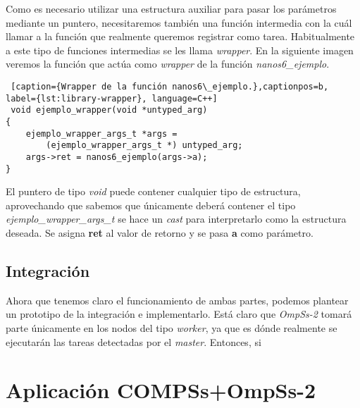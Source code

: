 Como es necesario utilizar una estructura auxiliar para pasar los parámetros mediante un puntero, necesitaremos también una función intermedia con la cuál llamar a la función que realmente queremos registrar como tarea. Habitualmente a este tipo de funciones intermedias se les llama \textit{wrapper}. En la siguiente imagen veremos la función que actúa como \textit{wrapper} de la función \textit{nanos6\_ejemplo}. \smallskip

\begin{lstlisting} [caption={Wrapper de la función nanos6\_ejemplo.},captionpos=b, label={lst:library-wrapper}, language=C++]
 void ejemplo_wrapper(void *untyped_arg)
{
    ejemplo_wrapper_args_t *args = 
        (ejemplo_wrapper_args_t *) untyped_arg;
    args->ret = nanos6_ejemplo(args->a);
}
\end{lstlisting}

El puntero de tipo \textit{void} puede contener cualquier tipo de estructura, aprovechando que sabemos que únicamente deberá contener el tipo \textit{ejemplo\_wrapper\_args\_t} se hace un \textit{cast} para interpretarlo como la estructura deseada. Se asigna \textbf{ret} al valor de retorno y se pasa \textbf{a} como parámetro.


\subsection{Integración}


Ahora que tenemos claro el funcionamiento de ambas partes, podemos plantear un prototipo de la integración e implementarlo. Está claro que \textit{OmpSs-2} tomará parte únicamente en los nodos del tipo \textit{worker}, ya que es dónde realmente se ejecutarán las tareas detectadas por el \textit{master}. Entonces, si 


\section{Aplicación COMPSs+OmpSs-2}



